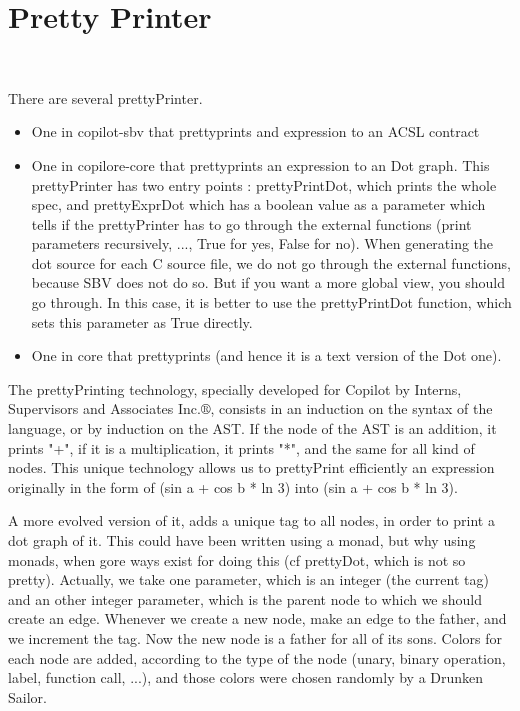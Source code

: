 \section{Pretty Printer}~\label{sec:pretty}


There are several prettyPrinter.
\begin{itemize}
	\item One in copilot-sbv that prettyprints and expression to an ACSL contract
	\item One in copilore-core that prettyprints an expression to an Dot graph. This prettyPrinter has two entry points : prettyPrintDot, which prints the whole spec, and prettyExprDot which has a boolean value as a parameter which tells if the prettyPrinter has to go through the external functions (print parameters recursively, ..., True for yes, False for no). When generating the dot source for each C source file, we do not go through the external functions, because SBV does not do so. But if you want a more global view, you should go through. In this case, it is better to use the prettyPrintDot function, which sets this parameter as True directly.
	\item One in core that prettyprints (and hence it is a text version of the Dot one).
\end{itemize}


The prettyPrinting technology, specially developed for Copilot by Interns, Supervisors and Associates Inc.$\circledR$, consists in an induction on the syntax of the language, or by induction on the AST. If the node of the AST is an addition, it prints "+", if it is a multiplication, it prints "*", and the same for all kind of nodes. This unique technology allows us to prettyPrint efficiently an expression originally in the form of (sin a + cos b * ln 3) into (sin a + cos b * ln 3).

A more evolved version of it, adds a unique tag to all nodes, in order to print a dot graph of it. This could have been written using a monad, but why using monads, when gore ways exist for doing this (cf prettyDot, which is not so pretty). Actually, we take one parameter, which is an integer (the current tag) and an other integer parameter, which is the parent node to which we should create an edge. Whenever we create a new node, make an edge to the father, and we increment the tag. Now the new node is a father for all of its sons. Colors for each node are added, according to the type of the node (unary, binary operation, label, function call, ...), and those colors were chosen randomly by a Drunken Sailor. 